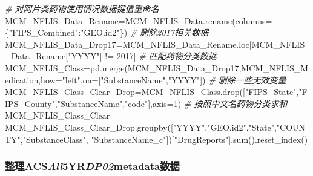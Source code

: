 \documentclass[
]{article}
\newenvironment{Shaded}{}{}
\newcommand{\BuiltInTok}[1]{#1}
\newcommand{\CommentTok}[1]{\textcolor[rgb]{0.38,0.63,0.69}{\textit{#1}}}
\newcommand{\DecValTok}[1]{\textcolor[rgb]{0.25,0.63,0.44}{#1}}
\newcommand{\NormalTok}[1]{#1}
\newcommand{\OperatorTok}[1]{\textcolor[rgb]{0.40,0.40,0.40}{#1}}
\newcommand{\StringTok}[1]{\textcolor[rgb]{0.25,0.44,0.63}{#1}}
\begin{document}
\begin{Shaded}
\begin{Highlighting}[]
\CommentTok{\# 对阿片类药物使用情况数据键值重命名}
\NormalTok{MCM\_NFLIS\_Data\_Rename}\OperatorTok{=}\NormalTok{MCM\_NFLIS\_Data.rename(columns}\OperatorTok{=}\NormalTok{\{}\StringTok{"FIPS\_Combined"}\NormalTok{:}\StringTok{"GEO.id2"}\NormalTok{\})}
\CommentTok{\# 删除2017相关数据}
\NormalTok{MCM\_NFLIS\_Data\_Drop17}\OperatorTok{=}\NormalTok{MCM\_NFLIS\_Data\_Rename.loc[MCM\_NFLIS\_Data\_Rename[}\StringTok{"YYYY"}\NormalTok{] }\OperatorTok{!=} \DecValTok{2017}\NormalTok{]}
\CommentTok{\# 匹配药物分类数据}
\NormalTok{MCM\_NFLIS\_Class}\OperatorTok{=}\NormalTok{pd.merge(MCM\_NFLIS\_Data\_Drop17,MCM\_NFLIS\_Medication,how}\OperatorTok{=}\StringTok{"left"}\NormalTok{,on}\OperatorTok{=}\NormalTok{[}\StringTok{"SubstanceName"}\NormalTok{,}\StringTok{"YYYY"}\NormalTok{])}
\CommentTok{\# 删除一些无效变量}
\NormalTok{MCM\_NFLIS\_Class\_Clear\_Drop}\OperatorTok{=}\NormalTok{MCM\_NFLIS\_Class.drop([}\StringTok{"FIPS\_State"}\NormalTok{,}\StringTok{"FIPS\_County"}\NormalTok{,}\StringTok{"SubstanceName"}\NormalTok{,}\StringTok{"code"}\NormalTok{],axis}\OperatorTok{=}\DecValTok{1}\NormalTok{)}
\CommentTok{\# 按照中文名药物分类求和}
\NormalTok{MCM\_NFLIS\_Class\_Clear }\OperatorTok{=}\NormalTok{ MCM\_NFLIS\_Class\_Clear\_Drop.groupby([}\StringTok{"YYYY"}\NormalTok{,}\StringTok{"GEO.id2"}\NormalTok{,}\StringTok{"State"}\NormalTok{,}\StringTok{"COUNTY"}\NormalTok{,}\StringTok{"SubstanceClass"}\NormalTok{,}
                                                        \StringTok{"SubstanceName\_c"}\NormalTok{])[}\StringTok{"DrugReports"}\NormalTok{].}\BuiltInTok{sum}\NormalTok{().reset\_index()}
\end{Highlighting}
\end{Shaded}

\hypertarget{header-n213}{%
\subsubsection{\texorpdfstring{整理ACS\emph{All}5YR\emph{DP02}metadata数据}{整理ACSAll5YRDP02metadata数据}}\label{header-n213}}
\end{document}

